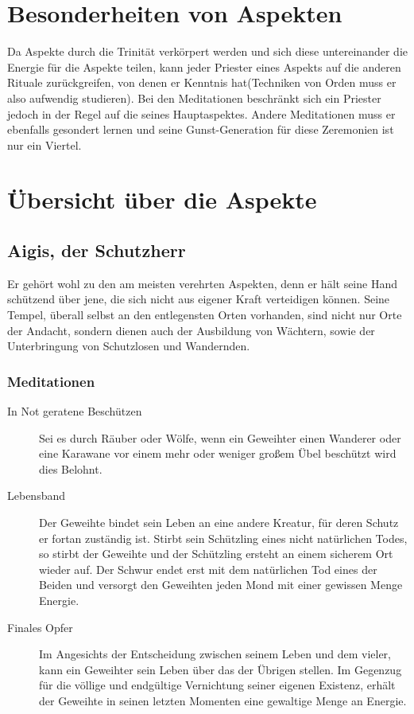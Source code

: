 \documentclass[a4paper,12pt,oneside]{book}
\begin{document}
\section{Besonderheiten von Aspekten}
Da Aspekte durch die Trinität verkörpert werden und sich diese untereinander die Energie für die Aspekte teilen, kann jeder Priester eines Aspekts auf die anderen Rituale zurückgreifen, von denen er Kenntnis hat(Techniken von Orden muss er also aufwendig studieren). Bei den Meditationen beschränkt sich ein Priester jedoch in der Regel auf die seines Hauptaspektes. Andere Meditationen muss er ebenfalls gesondert lernen und seine Gunst-Generation für diese Zeremonien ist nur ein Viertel.

\section{Übersicht über die Aspekte}

\subsection{Aigis, der Schutzherr}
Er gehört wohl zu den am meisten verehrten Aspekten, denn er hält seine Hand schützend über jene, die sich nicht aus eigener Kraft verteidigen können. Seine Tempel, überall selbst an den entlegensten Orten vorhanden, sind nicht nur Orte der Andacht, sondern dienen auch der Ausbildung von Wächtern, sowie der Unterbringung von Schutzlosen und Wandernden. 
\subsubsection{Meditationen}
\begin{description}
\item[In Not geratene Beschützen]
Sei es durch Räuber oder Wölfe, wenn ein Geweihter einen Wanderer oder eine Karawane vor einem mehr oder weniger großem Übel beschützt wird dies Belohnt.
\item[Lebensband]
Der Geweihte bindet sein Leben an eine andere Kreatur, für deren Schutz er fortan zuständig ist. Stirbt sein Schützling eines nicht natürlichen Todes, so stirbt der Geweihte und der Schützling ersteht an einem sicherem Ort wieder auf. Der Schwur endet erst mit dem natürlichen Tod eines der Beiden und versorgt den Geweihten jeden Mond mit einer gewissen Menge Energie.
\item[Finales Opfer]
Im Angesichts der Entscheidung zwischen seinem Leben und dem vieler, kann ein Geweihter sein Leben über das der Übrigen stellen. Im Gegenzug für die völlige und endgültige Vernichtung seiner eigenen Existenz, erhält der Geweihte in seinen letzten Momenten eine gewaltige Menge an Energie.
\end{description}
\end{document}

